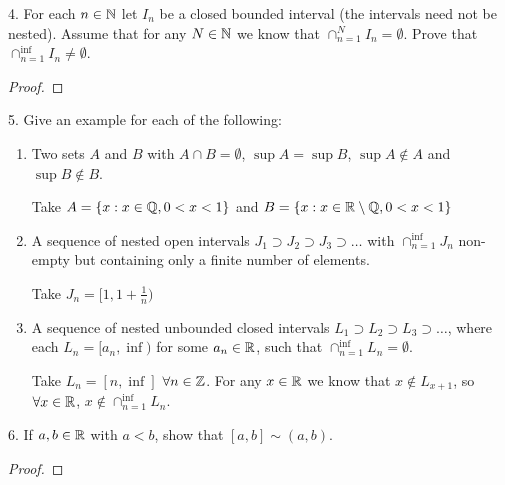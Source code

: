 
4. For each $n \in \mathbb{N}$ let $I_n$ be a closed bounded interval (the intervals need not be nested). Assume that for any $N \in \mathbb{N}$ we know that $\cap_{n=1}^{N}I_n = \emptyset$. Prove that $\cap_{n=1}^{\inf}I_n \neq \emptyset$.

\begin{proof}
	
\end{proof}





5. Give an example for each of the following: 
\begin{enumerate}
	\item Two sets $A$ and $B$ with $A \cap B = \emptyset$, $\sup A = \sup B$, $\sup A \not\in A$ and $\sup B \not\in B$.

		Take $A = \{x : x \in \mathbb{Q}, 0 < x < 1\}$  and  $B = \{x : x \in \mathbb{R} \setminus \mathbb{Q}, 0 < x < 1\} $	
	\item A sequence of nested open intervals $J_1 \supset J_2 \supset J_3 \supset \ldots$ with $\cap_{n=1}^{\inf}J_n$ non-empty but containing only a finite number of elements.

		Take $J_n = [1, 1 + \frac{1}{n})$
	\item A sequence of nested unbounded closed intervals $L_1 \supset L_2 \supset L_3 \supset \ldots$, where each $L_n = [a_n, \inf)$ for some $a_n \in \mathbb{R}$, such that $\cap_{n=1}^{\inf}L_n = \emptyset$. 

		Take $L_n = [n, \inf]$ $\forall n \in \mathbb{Z}$. For any $x \in \mathbb{R}$ we know that $x \not\in L_{x + 1}$, so $\forall x \in \mathbb{R}$, $x \not\in \cap_{n=1}^{\inf} L_n$.
\end{enumerate}





6. If $a, b \in \mathbb{R}$ with $a < b$, show that $[a, b] \sim \left( a, b \right) $.

\begin{proof}
	
\end{proof}























